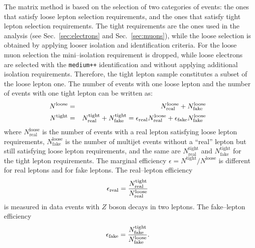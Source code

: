 The matrix method is based on the selection of two categories of
events: the ones that satisfy loose lepton selection requirements, and
the ones that satisfy tight lepton selection requirements. The tight
requirements are the ones used in the analysis (see
Sec.~\ref{sec:electrons} and Sec.~\ref{sec:muons}), while the loose
selection is obtained by applying looser isolation and identification
criteria. For the loose muon selection the mini--isolation requirement
is dropped, while loose electrons are selected with the
\texttt{medium++} identification and without applying additional
isolation requirements.
Therefore, the tight lepton sample constitutes a subset of
the loose lepton one.
The number of events with one loose lepton and
the number of events with one tight lepton can be written as:
%                                                                                             
\begin{eqnarray}
  N^\mathrm{loose}
  & = & N^\mathrm{loose}_\mathrm{real}
  + N^{\mathrm{loose}}_\mathrm{fake} \nonumber \\
  N^\mathrm{tight}
  & = & N^\mathrm{tight}_\mathrm{real}
  + N^{\mathrm{tight}}_\mathrm{fake} =
  \epsilon_{\mathrm{real}}{}N^\mathrm{loose}_\mathrm{real} + \epsilon_{\mathrm{fake}}{}N^\mathrm{loose}_\mathrm{fake}
  \label{eqn:intro-mm-Nloose}
\end{eqnarray}
%                                                                                             
where $N^\mathrm{loose}_\mathrm{real}$ is the number of events with a
real lepton satisfying loose lepton requirements,
$N^\mathrm{loose}_\mathrm{fake}$ is the number of multijet events
without a ``real'' lepton but still satisfying loose
lepton requirements, and the same are $N^\mathrm{tight}_\mathrm{real}$
and $N^\mathrm{tight}_\mathrm{fake}$ for the tight
lepton requirements. The marginal efficiency
$\epsilon=N^\mathrm{tight}/N^\mathrm{loose}$ is different for real
leptons and for fake leptons. The real--lepton efficiency
%                                                                                             
\begin{equation}
  \epsilon_{\mathrm{real}}{}
  = \frac{N^\mathrm{tight}_\mathrm{real}}{N^\mathrm{loose}_\mathrm{real}}
\end{equation}
is measured in data events with $Z$ boson decays in two leptons.
The fake--lepton efficiency
\begin{equation}
  \epsilon_{\mathrm{fake}}{}
  = \frac{N^\mathrm{tight}_\mathrm{fake}}{N^\mathrm{loose}_\mathrm{fake}}.
  \label{eqn:intro-mm-real-fake}
\end{equation}
